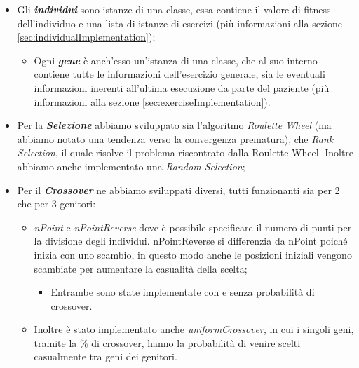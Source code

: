 \documentclass{article}
\begin{document}
\begin{itemize}
\item Gli \textbf{\textit{individui}} sono istanze di una classe, essa contiene il valore di fitness dell'individuo e una lista di istanze di esercizi (più informazioni alla sezione \ref{sec:individualImplementation});

\begin{itemize}

\item Ogni \textbf{\textit{gene}} è anch'esso un'istanza di una classe, che al suo interno contiene tutte le informazioni dell'esercizio generale, sia le eventuali informazioni inerenti all'ultima esecuzione da parte del paziente (più informazioni alla sezione \ref{sec:exerciseImplementation}).

\end{itemize}

\item Per la \textbf{\textit{Selezione}} abbiamo sviluppato sia l'algoritmo \textit{Roulette Wheel} (ma abbiamo notato una tendenza verso la convergenza prematura), che \textit{Rank Selection}, il quale risolve il problema riscontrato dalla Roulette Wheel. Inoltre abbiamo anche implementato una \textit{Random Selection};

\item Per il \textbf{\textit{Crossover}} ne abbiamo sviluppati diversi, tutti funzionanti sia per 2 che per 3 genitori:

\begin{itemize}

\item \textit{nPoint} e \textit{nPointReverse} dove è possibile specificare il numero di punti per la divisione degli individui. nPointReverse si differenzia da nPoint poiché inizia con uno scambio, in questo modo anche le posizioni iniziali vengono scambiate per aumentare la casualità della scelta;
\begin{itemize}
    \item Entrambe sono state implementate con e senza probabilità di crossover.
\end{itemize}
\item Inoltre è stato implementato anche \textit{uniformCrossover}, in cui i singoli geni, tramite la \% di crossover, hanno la probabilità di venire scelti casualmente tra geni dei genitori.

\end{itemize}

\pagebreak


\end{itemize}
\end{document}
